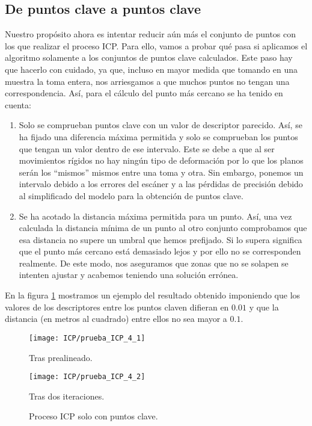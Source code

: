 \subsection{De puntos clave a puntos clave}
Nuestro propósito ahora es intentar reducir aún más el conjunto de puntos con los que realizar el proceso ICP. Para ello, vamos a probar qué pasa si aplicamos el algoritmo solamente a los conjuntos de puntos clave calculados. Este paso hay que hacerlo con cuidado, ya que, incluso en mayor medida que tomando en una muestra la toma entera, nos arriesgamos a que muchos puntos no tengan una correspondencia. Así, para el cálculo del punto más cercano se ha tenido en cuenta: 

\begin{enumerate}
\item Solo se comprueban puntos clave con un valor de descriptor parecido. Así, se ha fijado una diferencia máxima permitida y solo se comprueban los puntos que tengan un valor dentro de ese intervalo. Este se debe a que al ser movimientos rígidos no hay ningún tipo de deformación por lo que los planos serán los ``mismos'' mismos entre una toma y otra. Sin embargo, ponemos un intervalo debido a los errores del escáner y a las pérdidas de precisión debido al simplificado del modelo para la obtención de puntos clave.
\item Se ha acotado la distancia máxima permitida para un punto. Así, una vez calculada la distancia mínima de un punto al otro conjunto comprobamos que esa distancia no supere un umbral que hemos prefijado. Si lo supera significa que el punto más cercano está demasiado lejos y por ello no se corresponden realmente. De este modo, nos aseguramos que zonas que no se solapen se intenten ajustar y acabemos teniendo una solución errónea. 
\end{enumerate}

En la figura \ref{fig:KPKPICP} mostramos un ejemplo del resultado obtenido imponiendo que los valores de los descriptores entre los puntos claven difieran en $ 0.01 $ y que la distancia (en metros al cuadrado) entre ellos no sea mayor a $ 0.1 $. \\

\begin{figure}[h!]
	
	\begin{minipage}[b]{0.5\textwidth}
		\centering
		\texttt{[image: ICP/prueba\_ICP\_4\_1]} 
		\caption*{Tras prealineado.}
	\end{minipage}
	\begin{minipage}[b]{0.5\textwidth}
		\centering
		\texttt{[image: ICP/prueba\_ICP\_4\_2]}
		\caption*{Tras dos iteraciones.}
	\end{minipage}
	\caption{Proceso ICP solo con puntos clave.}
	\label{fig:KPKPICP}
\end{figure}

